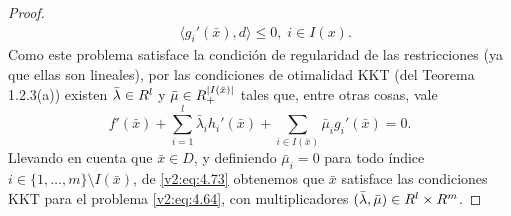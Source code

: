 \begin{proof}
\begin{equation}
\begin{array}{rl}
            & \langle g_i'(\bar{x}), d \rangle \le 0, \; i \in I(x).
        \end{array}
        \label{v2:eq:4.72}
    \end{equation}
    Como este problema satisface la condición de regularidad de las restricciones (ya que ellas son lineales), por las condiciones de otimalidad KKT (del Teorema 1.2.3(a)) existen $\bar{\lambda} \in R^l$ y $\bar{\mu} \in R^{|I(\bar{x})|}_+$ tales que, entre otras cosas, vale
    \begin{equation}
        f'(\bar{x}) + \sum_{i=1}^l \bar{\lambda}_i h_i'(\bar{x}) + \sum_{i \in I(\bar{x})} \bar{\mu}_i g_i'(\bar{x}) = 0.
        \label{v2:eq:4.73}
    \end{equation}
    Llevando en cuenta que $\bar{x} \in D$, y definiendo $\bar{\mu}_i = 0$ para todo índice $i \in \{1, \dots, m\} \setminus I(\bar{x})$, de \eqref{v2:eq:4.73} obtenemos que $\bar{x}$ satisface las condiciones KKT para el problema \eqref{v2:eq:4.64}, con multiplicadores $(\bar{\lambda}, \bar{\mu}) \in R^l \times R^m$.


\end{proof}
